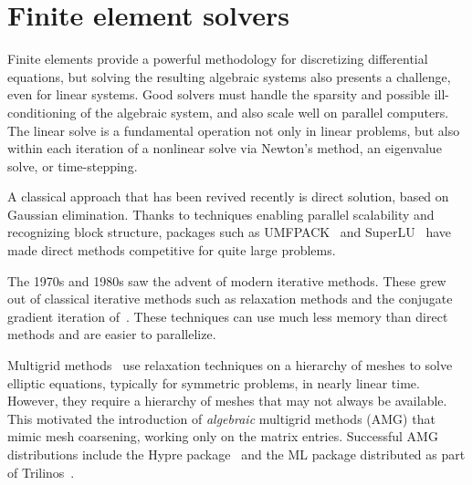 \enlargethispage{12pt}

\section{Finite element solvers}

Finite elements provide a powerful methodology for discretizing
differential equations, but solving the resulting algebraic systems
also presents a challenge, even for linear systems. Good solvers must
handle the sparsity and possible ill-conditioning of the algebraic
system, and also scale well on parallel computers.  The linear solve
is a fundamental operation not only in linear problems, but also
within each iteration of a nonlinear solve via Newton's method, an
eigenvalue solve, or time-stepping.

A classical approach that has been revived recently is direct
solution, based on Gaussian elimination.  Thanks to techniques
enabling parallel scalability and recognizing block structure,
packages such as UMFPACK~\citep{Davis2004} and SuperLU~\citep{Li2005}
have made direct methods competitive for quite large problems.

The 1970s and 1980s saw the advent of modern iterative methods. These
grew out of classical iterative methods such as relaxation methods and
the conjugate gradient iteration of~\citet{HestenesStiefel1952}. These
techniques can use much less memory than direct methods and are easier
to parallelize.

\pagebreak

Multigrid methods~\citep{Brandt1977,Wesseling1992} use relaxation
techniques on a hierarchy of meshes to solve elliptic equations,
typically for symmetric problems, in nearly linear time. However, they
require a hierarchy of meshes that may not always be available.  This
motivated the introduction of \emph{algebraic} multigrid methods (AMG)
that mimic mesh coarsening, working only on the matrix entries.
Successful AMG distributions include the Hypre
package~\citep{FalgoutYang2002} and the ML package distributed as part
of Trilinos~\citep{HerouxBartlettHowleEtAl2005}.

